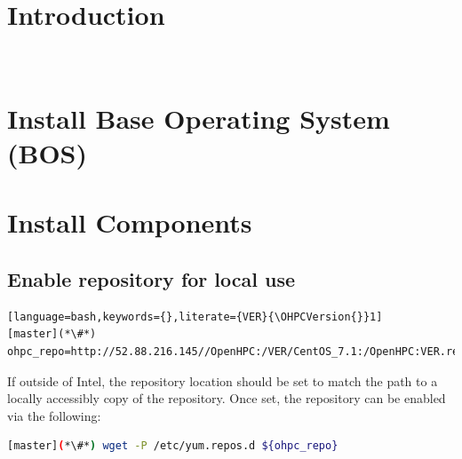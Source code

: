 \documentclass[letterpaper]{article}
\begin{document}
% 

\tableofcontents
\newpage


\section{Introduction} \label{sec:introduction}

 \\







\section{Install Base Operating System (BOS)}



\section{Install \OHPC{} Components} \label{sec:basic_install}


\subsection{Enable \OHPC{} repository for local use} \label{sec:enable_repo}


\begin{lstlisting}[language=bash,keywords={},literate={VER}{\OHPCVersion{}}1]
[master](*\#*) ohpc_repo=http://52.88.216.145//OpenHPC:/VER/CentOS_7.1:/OpenHPC:VER.repo

\end{lstlisting}

If outside of Intel, the repository location should be set to match the path to
a locally accessibly copy of the \OHPC{} repository. Once set, the repository can be
enabled via the following: 

\begin{lstlisting}[language=bash,keywords={}]
[master](*\#*) wget -P /etc/yum.repos.d ${ohpc_repo}
\end{lstlisting}
\end{document}
